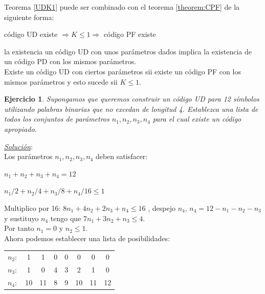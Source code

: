 \documentclass{beamer}
\newtheorem{ejercicio} [Corolario]{Ejercicio}
\begin{document}


\begin{frame}      \small



Teorema \ref{UDK1} puede ser combinado con el teorema \ref{theorem:CPF} de la siguiente forma:

\begin{center}
código UD existe $\Longrightarrow K\leqslant 1 \Longrightarrow$ código PF existe
\end{center}

la existencia un código UD con unos parámetros dados implica la existencia de un código PD con los mismos parámetros. \\
\vspace{15pt}
Existe un código UD con ciertos parámetros sii existe un código PF con los mismos parámetros y esto sucede sii $K\leqslant 1$.
\end{frame}



\begin{frame}      \small
 
 
  \begin{ejercicio}

 Supongamos que queremos construir un código UD para 12 símbolos utilizando palabras binarias que no excedan de longitud 4. Establezca una lista de todos los conjuntos de parámetros $n_1,n_2,n_3, n_4$ para el cual existe un código apropiado.
 \end{ejercicio}
 
  \pause
  \textit{\underline{Solución}}:\\
  
  Los parámetros $n_1,n_2,n_3, n_4$ deben satisfacer:
  
\begin{center}
  $n_1+n_2+n_3+n_4=12$ 
\end{center}
\begin{center}  
  $n_1/2+n_2/4+n_3/8+n_4/16\leqslant 1$ 
\end{center}

  Multiplico por 16: $8 n_1 + 4 n_2 + 2 n_3 + n_4 \leqslant 16$ , despejo $n_4$, $n_4 =12-n_1- n_2-n_3$  y sustituyo $n_4$ tengo que $7 n_1 + 3 n_2 + n_3 \leqslant 4$.\\ 
  Por tanto $n_1=0$ y $n_2 \leqslant 1$. \\
  Ahora podemos establecer una lista de posibilidades:
  
  
  \begin{center}
  \begin{tabular}{cccccccc}
$n_2:$ & 1   &  1 & 0 & 0  & 0 &0 &0\\
$n_3:$ & 1   &  0 & 4 & 3  & 2 &1 &0\\
$n_4:$ & 10 & 11& 8 & 9  & 10 & 11 &12\\

\end{tabular}
\end{center}



\end{frame}
\end{document}
